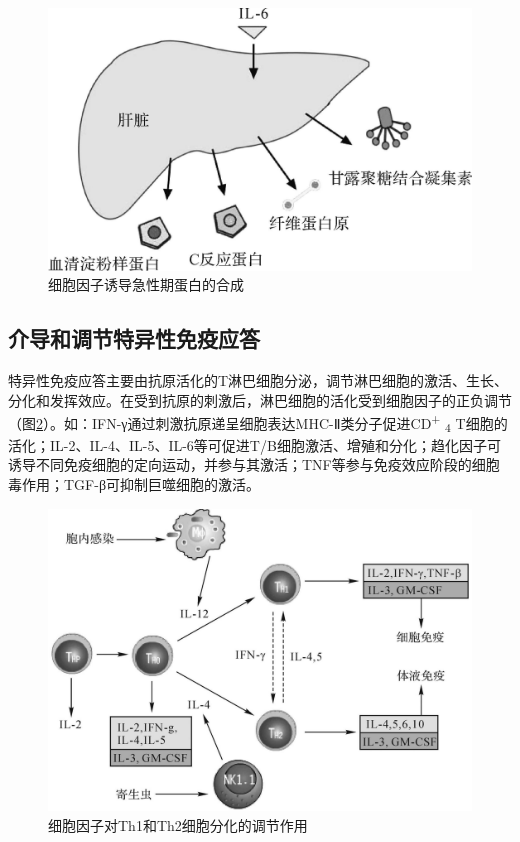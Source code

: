 \begin{figure}[!htbp]
 \centering
 \includegraphics{./images/Image00098.jpg}
 \captionsetup{justification=centering}
 \caption{细胞因子诱导急性期蛋白的合成}
 \label{fig6-8}
  \end{figure} 


\subsection{介导和调节特异性免疫应答}

特异性免疫应答主要由抗原活化的T淋巴细胞分泌，调节淋巴细胞的激活、生长、分化和发挥效应。在受到抗原的刺激后，淋巴细胞的活化受到细胞因子的正负调节（图\ref{fig6-9}）。如：IFN-γ通过刺激抗原递呈细胞表达MHC-Ⅱ类分子促进CD\textsuperscript{+}
\textsubscript{4}
T细胞的活化；IL-2、IL-4、IL-5、IL-6等可促进T/B细胞激活、增殖和分化；趋化因子可诱导不同免疫细胞的定向运动，并参与其激活；TNF等参与免疫效应阶段的细胞毒作用；TGF-β可抑制巨噬细胞的激活。

\begin{figure}[!htbp]
 \centering
 \includegraphics{./images/Image00099.jpg}
 \captionsetup{justification=centering}
 \caption{细胞因子对Th1和Th2细胞分化的调节作用}
 \label{fig6-9}
  \end{figure} 


